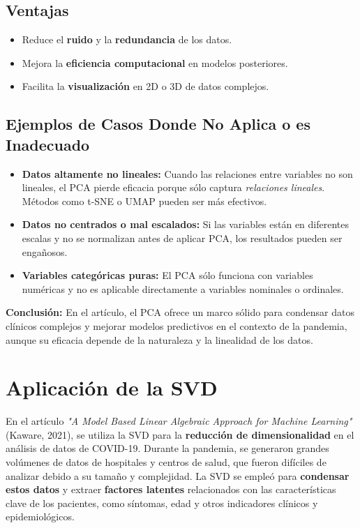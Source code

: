 \documentclass[12pt]{article}
\begin{document}
        \subsection*{Ventajas}
        \begin{itemize}
                \item Reduce el \textbf{ruido} y la \textbf{redundancia} de los datos.
                \item Mejora la \textbf{eficiencia computacional} en modelos posteriores.
                \item Facilita la \textbf{visualización} en 2D o 3D de datos complejos.
        \end{itemize}
        
        \subsection*{Ejemplos de Casos Donde No Aplica o es Inadecuado}
        \begin{itemize}
                \item \textbf{Datos altamente no lineales:} Cuando las relaciones entre variables no son lineales, el PCA pierde eficacia porque sólo captura \emph{relaciones lineales}. Métodos como t-SNE o UMAP pueden ser más efectivos.
                \item \textbf{Datos no centrados o mal escalados:} Si las variables están en diferentes escalas y no se normalizan antes de aplicar PCA, los resultados pueden ser engañosos.
                \item \textbf{Variables categóricas puras:} El PCA sólo funciona con variables numéricas y no es aplicable directamente a variables nominales o ordinales.
        \end{itemize}
        
        \vspace{1em}
        \noindent
        \textbf{Conclusión:} En el artículo, el PCA ofrece un marco sólido para condensar datos clínicos complejos y mejorar modelos predictivos en el contexto de la pandemia, aunque su eficacia depende de la naturaleza y la linealidad de los datos.
        
        \section*{Aplicación de la SVD}
        \noindent
        En el artículo \textit{"A Model Based Linear Algebraic Approach for Machine Learning"} (Kaware, 2021), se utiliza la SVD para la \textbf{reducción de dimensionalidad} en el análisis de datos de COVID-19. Durante la pandemia, se generaron grandes volúmenes de datos de hospitales y centros de salud, que fueron difíciles de analizar debido a su tamaño y complejidad. La SVD se empleó para \textbf{condensar estos datos} y extraer \textbf{factores latentes} relacionados con las características clave de los pacientes, como síntomas, edad y otros indicadores clínicos y epidemiológicos.
        
\end{document}
